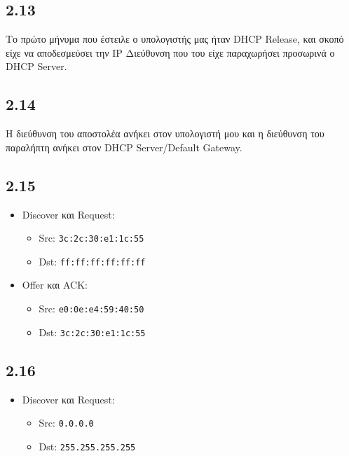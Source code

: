 		\subsection*{2.13}
			Το πρώτο μήνυμα που έστειλε ο υπολογιστής μας ήταν DHCP Release, και σκοπό είχε να αποδεσμεύσει την IP Διεύθυνση που του είχε παραχωρήσει προσωρινά ο DHCP Server.

		\subsection*{2.14}
			Η διεύθυνση του αποστολέα ανήκει στον υπολογιστή μου και η διεύθυνση του παραλήπτη ανήκει στον DHCP Server/Default Gateway.

		\subsection*{2.15}
			\begin{itemize}
				\item Discover και Request:
					\begin{itemize}
						\item Src: \verb|3c:2c:30:e1:1c:55|
						\item Dst: \verb|ff:ff:ff:ff:ff:ff|
					\end{itemize}
			\end{itemize}

			\begin{itemize}
				\item Offer και ACK:
					\begin{itemize}
						\item Src: \verb|e0:0e:e4:59:40:50|
						\item Dst: \verb|3c:2c:30:e1:1c:55|
						
					\end{itemize}
			\end{itemize}
			
		\subsection*{2.16}
			\begin{itemize}
				\item Discover και Request:
				\begin{itemize}
					\item Src: \verb|0.0.0.0|
					\item Dst: \verb|255.255.255.255|
				\end{itemize}
			\end{itemize}
			
